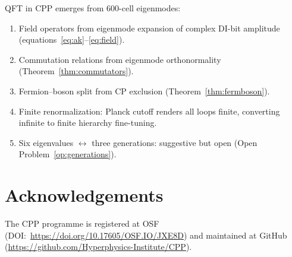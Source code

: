 \documentclass[11pt,letterpaper]{article}
\begin{document}
QFT in CPP emerges from 600-cell eigenmodes:
\begin{enumerate}
\item Field operators from eigenmode expansion of complex DI-bit
  amplitude (equations~\eqref{eq:ak}--\eqref{eq:field}).
\item Commutation relations from eigenmode orthonormality
  (Theorem~\ref{thm:commutators}).
\item Fermion--boson split from CP exclusion
  (Theorem~\ref{thm:fermboson}).
\item Finite renormalization: Planck cutoff renders all loops finite,
  converting infinite to finite hierarchy fine-tuning.
\item Six eigenvalues $\leftrightarrow$ three generations: suggestive
  but open (Open Problem~\ref{op:generations}).
\end{enumerate}



\section*{Acknowledgements}
The CPP programme is registered at OSF (DOI:~\url{https://doi.org/10.17605/OSF.IO/JXE8D}) and maintained at GitHub (\url{https://github.com/Hyperphysics-Institute/CPP}).



\end{document}
